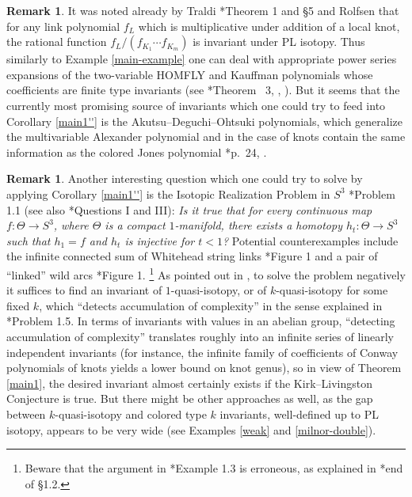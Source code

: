 \documentclass[a4paper,12pt,reqno,oneside]{amsart} %
\theoremstyle{plain}
\theoremstyle{definition}
\newtheorem{remark}[theorem]{Remark}
\theoremstyle{named}
\renewcommand{\:}{\colon}
\begin{document}
\begin{remark}
It was noted already by Traldi \cite{Tr2}*{Theorem 1 and \S5} and Rolfsen \cite{Ro4} that for any link polynomial $f_L$ which is multiplicative 
under addition of a local knot, the rational function $f_L/(f_{K_1}\cdots f_{K_m})$ is invariant under PL isotopy.
Thus similarly to Example \ref{main-example} one can deal with appropriate power series expansions of the two-variable HOMFLY and Kauffman 
polynomials whose coefficients are finite type invariants (see \cite{BN}*{Theorem ~3}, \cite{Lie}, \cite{HG}).
But it seems that the currently most promising source of invariants which one could try to feed into Corollary \ref{main1''} is 
the Akutsu--Deguchi--Ohtsuki polynomials, which generalize the multivariable Alexander polynomial and in the case of knots 
contain the same information as the colored Jones polynomial \cite{Wil}*{p.\ 24}, \cite{Wil2}.
\end{remark}

\begin{remark} 
Another interesting question which one could try to solve by applying Corollary \ref{main1''} is the Isotopic Realization Problem in $S^3$ 
\cite{MR1}*{Problem 1.1} (see also \cite{M02}*{Questions I and III}):
{\it Is it true that for every continuous map $f\:\Theta\to S^3$, where $\Theta$ is a compact $1$-manifold, there exists a homotopy 
$h_t\:\Theta\to S^3$ such that $h_1=f$ and $h_t$ is injective for $t<1$?}
Potential counterexamples include the infinite connected sum of Whitehead string links \cite{MR1}*{Figure 1} and
a pair of ``linked'' wild arcs \cite{M02}*{Figure 1}.%
\footnote{Beware that the argument in \cite{M02}*{Example 1.3} is erroneous, as explained in \cite{MR1}*{end of \S1.2}.}
As pointed out in \cite{MR1}, to solve the problem negatively it suffices to find an invariant of $1$-quasi-isotopy, or of $k$-quasi-isotopy 
for some fixed $k$, which ``detects accumulation of complexity'' in the sense explained in \cite{MR1}*{Problem 1.5}.
In terms of invariants with values in an abelian group, ``detecting accumulation of complexity'' translates roughly into an infinite series of 
linearly independent invariants (for instance, the infinite family of coefficients of Conway polynomials of knots yields a lower bound on knot genus),
so in view of Theorem \ref{main1}, the desired invariant almost certainly exists if the Kirk--Livingston Conjecture is true.
But there might be other approaches as well, as the gap between $k$-quasi-isotopy and colored type $k$ invariants, well-defined up to PL isotopy,
appears to be very wide (see Examples \ref{weak} and \ref{milnor-double}).
\end{remark}
\end{document}
